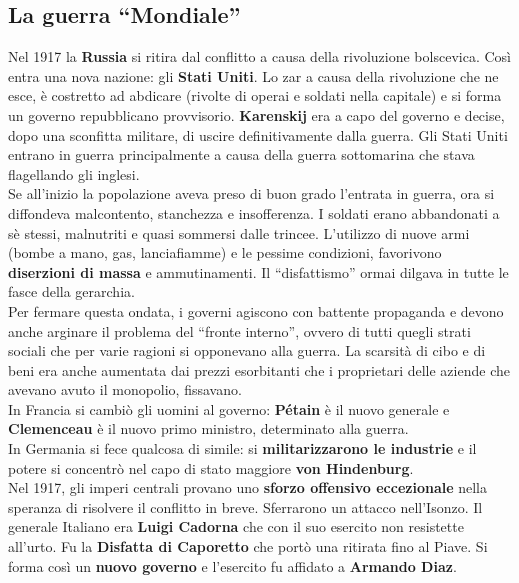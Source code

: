 \subsection{La guerra ``Mondiale''}
Nel 1917 la \textbf{Russia} si ritira dal conflitto a causa della rivoluzione bolscevica. Così entra
una nova nazione: gli \textbf{Stati Uniti}. Lo zar a causa della rivoluzione che ne esce, è
costretto ad abdicare (rivolte di operai e soldati nella capitale) e si forma un governo repubblicano
provvisorio. \textbf{Karenskij} era a capo del governo e decise, dopo una sconfitta militare, di
uscire definitivamente dalla guerra. Gli Stati Uniti entrano in guerra principalmente a causa della
guerra sottomarina che stava flagellando gli inglesi.\\ [\baselineskip]
Se all'inizio la popolazione aveva preso di buon grado l'entrata in guerra, ora si diffondeva
malcontento, stanchezza e insofferenza. I soldati erano abbandonati a sè stessi, malnutriti e quasi
sommersi dalle trincee. L'utilizzo di nuove armi (bombe a mano, gas, lanciafiamme) e le pessime
condizioni, favorivono \textbf{diserzioni di massa} e ammutinamenti. Il ``disfattismo'' ormai dilgava
in tutte le fasce della gerarchia.\\
Per fermare questa ondata, i governi agiscono con battente propaganda e devono anche arginare il 
problema del ``fronte interno'', ovvero di tutti quegli strati sociali che per varie ragioni si
opponevano alla guerra. La scarsità di cibo e di beni era anche aumentata dai prezzi esorbitanti che
i proprietari delle aziende che avevano avuto il monopolio, fissavano.\\
In Francia si cambiò gli uomini al governo: \textbf{Pétain} è il nuovo generale e \textbf{Clemenceau}
è il nuovo primo ministro, determinato alla guerra.\\
In Germania si fece qualcosa di simile: si \textbf{militarizzarono le industrie} e il potere si
concentrò nel capo di stato maggiore \textbf{von Hindenburg}.\\ [\baselineskip]
Nel 1917, gli imperi centrali provano uno \textbf{sforzo offensivo eccezionale} nella speranza
di risolvere il conflitto in breve. Sferrarono un attacco nell'Isonzo. Il generale Italiano era
\textbf{Luigi Cadorna} che con il suo esercito non resistette all'urto. Fu la \textbf{Disfatta di
Caporetto} che portò una ritirata fino al Piave. Si forma così un \textbf{nuovo governo} e l'esercito
fu affidato a \textbf{Armando Diaz}.

